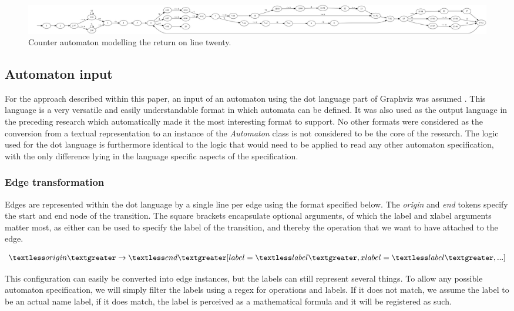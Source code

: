\documentclass[12pt]{article}
\begin{document}
\begin{landscape}
	\begin{figure}
		\centering
		\includegraphics[width=\linewidth]{final_overview_11}
		\caption{Counter automaton modelling the return on line twenty.}
		\label{fig:final_overview_11}
	\end{figure}
\end{landscape}

\subsection{Automaton input}
For the approach described within this paper, an input of an automaton using the dot language part of Graphviz was assumed \cite{10.1007/3-540-45848-4_57}. This language is a very versatile and easily understandable format in which automata can be defined. It was also used as the output language in the preceding research which automatically made it the most interesting format to support. No other formats were considered as the conversion from a textual representation to an instance of the \textit{Automaton} class is not considered to be the core of the research. The logic used for the dot language is furthermore identical to the logic that would need to be applied to read any other automaton specification, with the only difference lying in the language specific aspects of the specification.

\subsubsection{Edge transformation}
Edges are represented within the dot language by a single line per edge using the format specified below. The \textit{origin} and \textit{end} tokens specify the start and end node of the transition. The square brackets encapsulate optional arguments, of which the label and xlabel arguments matter most, as either can be used to specify the label of the transition, and thereby the operation that we want to have attached to the edge. 

\begin{gather*}
	\textless origin \textgreater \rightarrow \textless end\textgreater [label=\textless label\textgreater, xlabel=\textless label\textgreater, ...]
\end{gather*}

This configuration can easily be converted into edge instances, but the labels can still represent several things. To allow any possible automaton specification, we will simply filter the labels using a regex for operations and labels. If it does not match, we assume the label to be an actual name label, if it does match, the label is perceived as a mathematical formula and it will be registered as such. 
\end{document}
